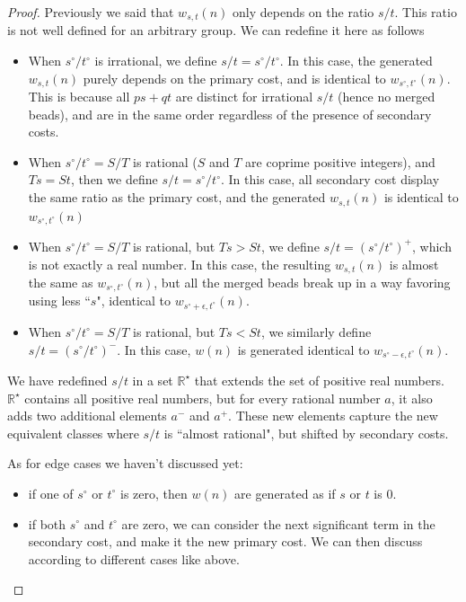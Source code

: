 \documentclass[]{article}
\begin{document}
\begin{proof}
Previously we said that $w_{s,t}(n)$ only depends on the ratio $s/t$. This ratio is not well defined for an arbitrary group. We can redefine it here as follows
\begin{itemize}
	\item When $s^\circ / t^\circ$ is irrational, we define $s/t =  s^\circ / t^\circ$. In this case, the generated $w_{s,t}(n)$ purely depends on the primary cost, and is identical to $w_{s^\circ, t^\circ}(n)$. This is because all $ps+qt$ are distinct for irrational $s/t$ (hence no merged beads), and are in the same order regardless of the presence of secondary costs.
	\item When $s^\circ / t^\circ = S/T$ is rational ($S$ and $T$ are coprime positive integers), and $Ts = St$, then we define $s/t = s^\circ/t^\circ$. In this case, all secondary cost display the same ratio as the primary cost, and the generated $w_{s,t}(n)$ is identical to $w_{s^\circ, t^\circ}(n)$
	\item When $s^\circ / t^\circ = S/T$ is rational, but $Ts > St$, we define $s/t = (s^\circ/t^\circ)^+$, which is not exactly a real number. In this case, the resulting $w_{s,t}(n)$ is almost the same as $w_{s^\circ, t^\circ}(n)$, but all the merged beads break up in a way favoring using less ``$s$", identical to $w_{s^\circ+\epsilon, t^\circ}(n)$.
	\item When $s^\circ / t^\circ = S/T$ is rational, but $Ts < St$, we similarly define $s/t = (s^\circ/t^\circ)^-$. In this case, $w(n)$ is generated  identical to $w_{s^\circ-\epsilon, t^\circ}(n)$.
\end{itemize}
We have redefined $s/t$ in a set $\mathbb{R}^\star$ that extends the set of positive real numbers. $\mathbb{R}^\star$ contains all positive real numbers, but for every rational number $a$, it also adds two additional elements $a^-$ and $a^+$. These new elements capture the new equivalent classes where $s/t$ is ``almost rational", but shifted by secondary costs.

As for edge cases we haven't discussed yet:
\begin{itemize}
	\item if one of $s^\circ$ or $t^\circ$ is zero, then $w(n)$ are generated as if $s$ or $t$ is 0.
	\item if both $s^\circ$ and $t^\circ$ are zero, we can consider the next significant term in the secondary cost, and make it the new primary cost. We can then discuss according to different cases like above.
\end{itemize}	
	
\end{proof}
\end{document}
